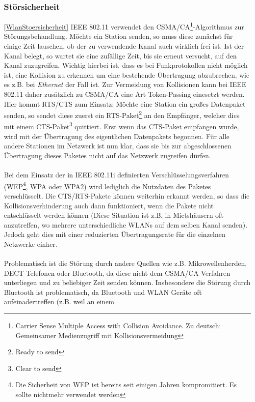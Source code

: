 \subsubsection{Störsicherheit}\ref{WlanStoersicherheit}
IEEE 802.11 verwendet den CSMA/CA\footnote{Carrier Sense Multiple Access with 
Collision Avoidance. Zu deutsch: Gemeinsamer Medienzugriff mit Kollisionsvermeidung}-Algorithmus
zur Störungsbehandlung. Möchte ein Station senden, so muss diese zunächst
für einige Zeit lauschen, ob der zu verwendende Kanal auch wirklich frei ist.
Ist der Kanal belegt, so wartet sie eine zufällige Zeit, bis sie erneut versucht,
auf den Kanal zuzugreifen. Wichtig hierbei ist, dass es bei Funkprotokollen nicht
möglich ist, eine Kollision zu erkennen um eine bestehende Übertragung abzubrechen,
wie es z.B. bei \textsl{Ethernet} der Fall ist. Zur Vermeidung von Kollisionen
kann bei IEEE 802.11 daher zusätzlich zu CSMA/CA eine Art Token-Passing einesetzt
werden. Hier kommt RTS/CTS zum Einsatz: Möchte eine Station ein großes Datenpaket
senden, so sendet diese zuerst ein RTS-Paket\footnote{Ready to send} an den Empfänger, 
welcher dies mit einem CTS-Paket\footnote{Clear to send} quittiert. Erst wenn das
CTS-Paket empfangen wurde, wird mit der Übertragung des eigentlichen Datenpakets
begonnen. Für alle andere Stationen im Netzwerk ist nun klar, dass sie bis zur
abgeschlossenen Übertragung dieses Paketes nicht auf das Netzwerk zugreifen
dürfen.\\
\\
Bei dem Einsatz der in IEEE 802.11i definierten Verschlüsselungsverfahren
(WEP\footnote{Die Sicherheit von WEP ist bereits seit einigen Jahren
 kompromitiert. Es sollte nichtmehr verwendet werden}, WPA oder WPA2) wird
lediglich die Nutzdaten des Paketes verschlüsselt. Die CTS/RTS-Pakete können
weiterhin erkannt werden, so dass die Kollisionsverhinderung auch dann
funktioniert, wenn die Pakete nicht entschlüsselt werden können (Diese 
Situation ist z.B. in Mietshäusern oft anzutreffen, wo mehrere 
unterschiedliche WLANs auf dem selben Kanal senden). Jedoch geht dies
mit einer reduzierten Übertragungsrate für die einzelnen Netzwerke
einher.\\
\\
Problematisch ist die Störung durch andere Quellen wie z.B. 
Mikrowellenherden, DECT Telefonen oder Bluetooth, da diese nicht
dem CSMA/CA Verfahren unterliegen und zu beliebiger Zeit senden können.
Insbesondere die Störung durch Bluetooth ist problematisch, da 
Bluetooth und WLAN Geräte oft aufeinadertreffen (z.B. weil an einem
